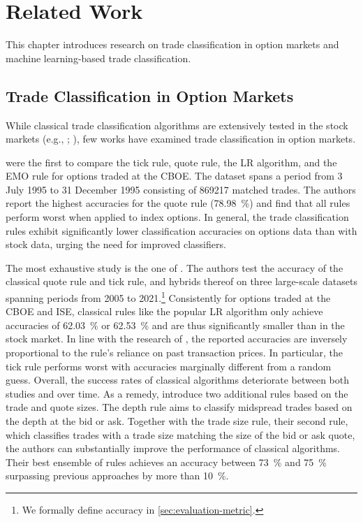 \section{Related Work}\label{sec:related-work}

This chapter introduces research on trade classification in option markets and machine learning-based trade classification.

\subsection{Trade Classification in Option Markets}
\label{sec:trade-classification-in-option-markets}

While classical trade classification algorithms are extensively tested in the stock markets (e.g., \textcite[][3806--3821]{chakrabartyTradeClassificationAlgorithms2007}; \textcite[][259--286]{odders-whiteOccurrenceConsequencesInaccurate2000}), few works have examined trade classification in option markets.

\textcite[][883--887]{savickasInferringDirectionOption2003} were the first to compare the tick rule, quote rule, the \gls{LR} algorithm, and the \gls{EMO} rule for options traded at the \gls{CBOE}. The dataset spans a period from 3 July 1995 to 31 December 1995 consisting of \num{869217} matched trades. The authors report the highest accuracies for the quote rule (\SI{78.98}{\percent}) and find that all rules perform worst when applied to index options. In general, the trade classification rules exhibit significantly lower classification accuracies on options data than with stock data, urging the need for improved classifiers.

The most exhaustive study is the one of \textcite[][1--53]{grauerOptionTradeClassification2022}. The authors test the accuracy of the classical quote rule and tick rule, and hybrids thereof on three large-scale datasets spanning periods from 2005 to 2021.\footnote{We formally define accuracy in \cref{sec:evaluation-metric}.} Consistently for options traded at the \gls{CBOE} and \gls{ISE}, classical rules like the popular \gls{LR}  algorithm only achieve accuracies of \SI{62.03}{\percent} or \SI{62.53}{\percent} and are thus significantly smaller than in the stock market. In line with the research of \textcite[][886]{savickasInferringDirectionOption2003}, the reported accuracies are inversely proportional to the rule's reliance on past transaction prices. In particular, the tick rule performs worst with accuracies marginally different from a random guess. Overall, the success rates of classical algorithms deteriorate between both studies and over time. As a remedy, \textcite[][13--15]{grauerOptionTradeClassification2022} introduce two additional rules based on the trade and quote sizes. The depth rule aims to classify midspread trades based on the depth at the bid or ask. Together with the trade size rule, their second rule, which classifies trades with a trade size matching the size of the bid or ask quote, the authors can substantially improve the performance of classical algorithms. Their best ensemble of rules achieves an accuracy between \SI{73}{\percent} and \SI{75}{\percent} surpassing previous approaches by more than \SI{10}{\percent}.

